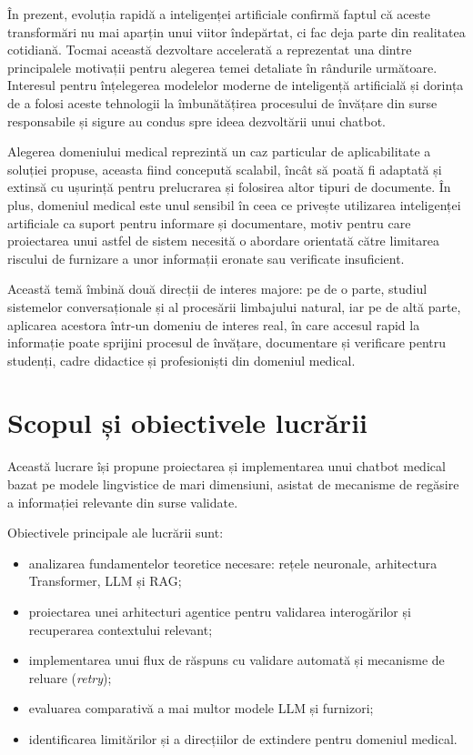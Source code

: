 \documentclass[12pt, a4paper, oneside, romanian]{teza-upb}
\begin{document}
În prezent, evoluția rapidă a inteligenței artificiale confirmă faptul că aceste transformări nu mai aparțin unui viitor îndepărtat, ci fac deja parte din realitatea cotidiană. Tocmai această dezvoltare accelerată a reprezentat una dintre principalele motivații pentru alegerea temei detaliate în rândurile următoare. Interesul pentru înțelegerea modelelor moderne de inteligență artificială și dorința de a folosi aceste tehnologii la îmbunătățirea procesului de învățare din surse responsabile și sigure au condus spre ideea dezvoltării unui chatbot.

Alegerea domeniului medical reprezintă un caz particular de aplicabilitate a soluției propuse, aceasta fiind concepută scalabil, încât să poată fi adaptată și extinsă cu ușurință pentru prelucrarea și folosirea altor tipuri de documente. În plus, domeniul medical este unul sensibil în ceea ce privește utilizarea inteligenței artificiale ca suport pentru informare și documentare, motiv pentru care proiectarea unui astfel de sistem necesită o abordare orientată către limitarea riscului de furnizare a unor informații eronate sau verificate insuficient.

Această temă îmbină două direcții de interes majore: pe de o parte, studiul sistemelor conversaționale și al procesării limbajului natural, iar pe de altă parte, aplicarea acestora într-un domeniu de interes real, în care accesul rapid la informație poate sprijini procesul de învățare, documentare și verificare pentru studenți, cadre didactice și profesioniști din domeniul medical.


\section{Scopul și obiectivele lucrării}

Această lucrare își propune proiectarea și implementarea unui chatbot medical bazat pe modele lingvistice de mari dimensiuni, asistat de mecanisme de regăsire a informației relevante din surse validate.

Obiectivele principale ale lucrării sunt:
\begin{itemize}
    \item analizarea fundamentelor teoretice necesare: rețele neuronale, arhitectura Transformer, LLM și RAG;
    \item proiectarea unei arhitecturi agentice pentru validarea interogărilor și recuperarea contextului relevant;
    \item implementarea unui flux de răspuns cu validare automată și mecanisme de reluare (\textit{retry});
    \item evaluarea comparativă a mai multor modele LLM și furnizori;
    \item identificarea limitărilor și a direcțiilor de extindere pentru domeniul medical.
\end{itemize}
\end{document}
